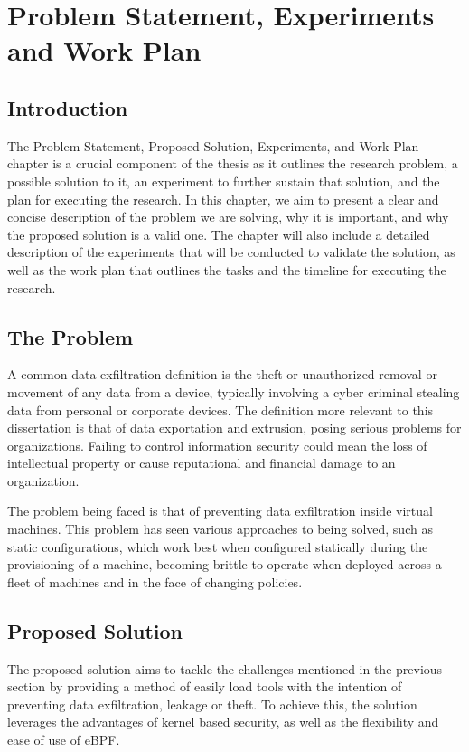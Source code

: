     
\chapter{Problem Statement, Experiments and Work Plan}

\section{Introduction}
The Problem Statement, Proposed Solution, Experiments, and Work Plan chapter is a crucial component of the thesis as it outlines the research problem, a possible solution to it, an experiment to further sustain that solution, and the plan for executing the research. In this chapter, we aim to present a clear and concise description of the problem we are solving, why it is important, and why the proposed solution is a valid one. The chapter will also include a detailed description of the experiments that will be conducted to validate the solution, as well as the work plan that outlines the tasks and the timeline for executing the research.

\section{The Problem}

A common data exfiltration definition is the theft or unauthorized removal or movement of any data from a device, typically involving a cyber criminal stealing data from personal or corporate devices. 
The definition more relevant to this dissertation is that of data exportation and extrusion, posing serious problems for organizations. Failing to control information security could mean the loss of intellectual property or cause reputational and financial damage to an organization. 

The problem being faced is that of preventing data exfiltration inside virtual machines. 
This problem has seen various approaches to being solved, such as static configurations, which work best when configured statically during the provisioning of a machine, becoming brittle to operate when deployed across a fleet of machines and in the face of changing policies.


\section{Proposed Solution}
The proposed solution aims to tackle the challenges mentioned in the previous section by providing a method of easily load tools with the intention of preventing data exfiltration, leakage or theft. To achieve this, the solution leverages the advantages of kernel based security, as well as the flexibility and ease of use of eBPF. 

